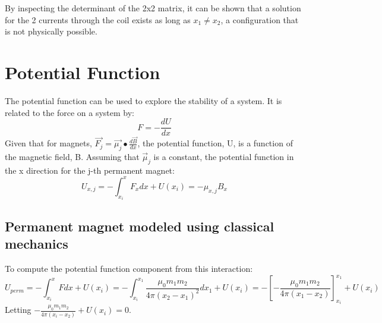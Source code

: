 \documentclass[english]{article}
\begin{document}
By inspecting the determinant of the 2x2 matrix, it can be shown that a solution for the 2 currents through the coil exists as long as $x_1 \neq x_2$, a configuration that is not physically possible.

\section*{Potential Function}
The potential function can be used to explore the stability of a system.  It is related to the force on a system by:
$$ F = -\frac{dU}{dx}$$
Given that for magnets, $\vec{F_j} = \vec{\mu_j} \bullet \frac{d\vec{B}}{dx}$, the potential function, U, is a function of the magnetic field, B.  Assuming that $\vec{\mu}_j$ is a constant, the potential function in the x direction for the j-th permanent magnet: \\
$$ U_{x,j} = -\int_{x_i}^{x} F_x dx + U(x_i) = - \mu_{x,j}B_x$$

%


\subsection*{Permanent magnet modeled using classical mechanics}
To compute the potential function component from this interaction:
$$U_{perm} = -\int_{x_i}^{x}F dx + U\left(x_i\right) = -\int_{x_i}^{x_1}\frac{\mu_0 m_1 m_2}{4 \pi \left(x_2-x_1\right)^2} dx_1 + U\left( x_i \right) = -\left[-\frac{\mu_0 m_1 m_2}{4\pi \left(x_1 - x_2\right)} \right]_{x_i}^{x_1} + U\left(x_i\right)$$
Letting $-\frac{\mu_0 m_1 m_2}{4\pi \left(x_i - x_2\right)} + U\left(x_i\right) = 0$.  
\end{document}
